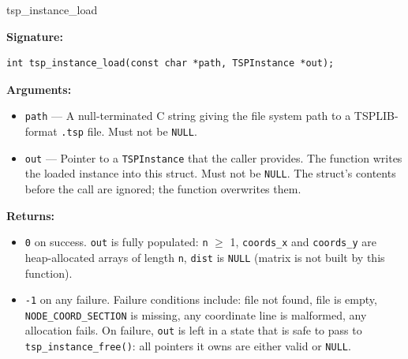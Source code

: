 \documentclass[11pt]{article}
\begin{document}
\newpage

\begin{apispec}{tsp\_instance\_load}

\textbf{Signature:}
\begin{lstlisting}[style=cstyle, numbers=none]
int tsp_instance_load(const char *path, TSPInstance *out);
\end{lstlisting}

\textbf{Arguments:}
\begin{itemize}
  \item \texttt{path} --- A null-terminated C string giving the file system path to a TSPLIB-format \texttt{.tsp} file. Must not be \texttt{NULL}.
  \item \texttt{out} --- Pointer to a \texttt{TSPInstance} that the caller provides. The function writes the loaded instance into this struct. Must not be \texttt{NULL}. The struct's contents before the call are ignored; the function overwrites them.
\end{itemize}

\textbf{Returns:}
\begin{itemize}
  \item \texttt{0} on success. \texttt{out} is fully populated: \texttt{n} $\geq$ 1, \texttt{coords\_x} and \texttt{coords\_y} are heap-allocated arrays of length \texttt{n}, \texttt{dist} is \texttt{NULL} (matrix is not built by this function).
  \item \texttt{-1} on any failure. Failure conditions include: file not found, file is empty, \texttt{NODE\_COORD\_SECTION} is missing, any coordinate line is malformed, any allocation fails. On failure, \texttt{out} is left in a state that is safe to pass to \texttt{tsp\_instance\_free()}: all pointers it owns are either valid or \texttt{NULL}.
\end{itemize}


\end{apispec}
\end{document}
